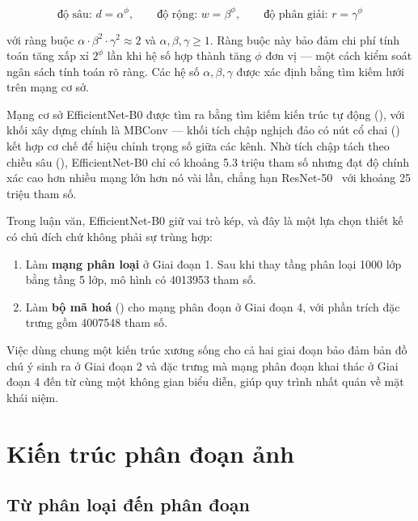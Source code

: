\begin{equation}
    \text{độ sâu: } d = \alpha^{\phi}, \qquad
    \text{độ rộng: } w = \beta^{\phi}, \qquad
    \text{độ phân giải: } r = \gamma^{\phi}
    \label{eq:compound_scaling}
\end{equation}

với ràng buộc $\alpha \cdot \beta^{2} \cdot \gamma^{2} \approx 2$ và
$\alpha, \beta, \gamma \geq 1$. Ràng buộc này bảo đảm chi phí tính toán tăng xấp
xỉ $2^{\phi}$ lần khi hệ số hợp thành tăng $\phi$ đơn vị --- một cách kiểm soát
ngân sách tính toán rõ ràng. Các hệ số $\alpha, \beta, \gamma$ được xác định bằng
tìm kiếm lưới trên mạng cơ sở.

Mạng cơ sở EfficientNet-B0 được tìm ra bằng tìm kiếm kiến trúc tự động
(), với khối xây dựng chính là MBConv --- khối
tích chập nghịch đảo có nút cổ chai () kết hợp
cơ chế  để hiệu chỉnh trọng số giữa các kênh. Nhờ tích
chập tách theo chiều sâu (), EfficientNet-B0
chỉ có khoảng \num{5.3} triệu tham số nhưng đạt độ chính xác cao hơn nhiều mạng
lớn hơn nó vài lần, chẳng hạn ResNet-50~\cite{he2016resnet} với khoảng
\num{25} triệu tham số.

Trong luận văn, EfficientNet-B0 giữ vai trò kép, và đây là một lựa chọn thiết kế
có chủ đích chứ không phải sự trùng hợp:

\begin{enumerate}
    \item Làm \textbf{mạng phân loại} ở Giai đoạn 1. Sau khi thay tầng phân loại
          1000 lớp bằng tầng 5 lớp, mô hình có \num{4013953} tham số.
    \item Làm \textbf{bộ mã hoá} () cho mạng phân đoạn ở Giai đoạn 4,
          với phần trích đặc trưng gồm \num{4007548} tham số.
\end{enumerate}

Việc dùng chung một kiến trúc xương sống cho cả hai giai đoạn bảo đảm bản đồ chú
ý sinh ra ở Giai đoạn 2 và đặc trưng mà mạng phân đoạn khai thác ở Giai đoạn 4
đến từ cùng một không gian biểu diễn, giúp quy trình nhất quán về mặt khái niệm.

\section{Kiến trúc phân đoạn ảnh}
\label{sec:unet}

\subsection{Từ phân loại đến phân đoạn}

